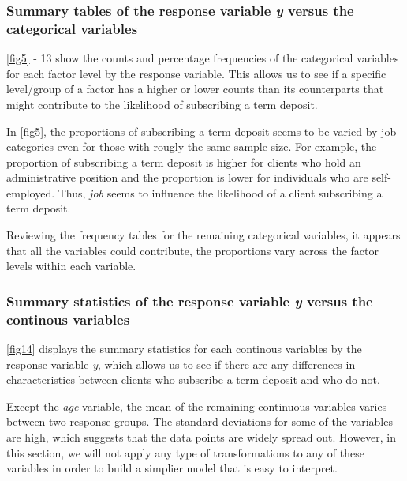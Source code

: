 \documentclass[]{article}
\begin{document}
\subsubsection{\texorpdfstring{Summary tables of the response variable
\emph{y} versus the categorical
variables}{Summary tables of the response variable y versus the categorical variables}}\label{summary-tables-of-the-response-variable-y-versus-the-categorical-variables}

\autoref{fig5} - 13 show the counts and percentage frequencies of the
categorical variables for each factor level by the response variable.
This allows us to see if a specific level/group of a factor has a higher
or lower counts than its counterparts that might contribute to the
likelihood of subscribing a term deposit.

In \autoref{fig5}, the proportions of subscribing a term deposit seems
to be varied by job categories even for those with rougly the same
sample size. For example, the proportion of subscribing a term deposit
is higher for clients who hold an administrative position and the
proportion is lower for individuals who are self-employed. Thus,
\emph{job} seems to influence the likelihood of a client subscribing a
term deposit.

Reviewing the frequency tables for the remaining categorical variables,
it appears that all the variables could contribute, the proportions vary
across the factor levels within each variable.

\subsubsection{\texorpdfstring{Summary statistics of the response
variable \emph{y} versus the continous
variables}{Summary statistics of the response variable y versus the continous variables}}\label{summary-statistics-of-the-response-variable-y-versus-the-continous-variables}

\autoref{fig14} displays the summary statistics for each continous
variables by the response variable \emph{y}, which allows us to see if
there are any differences in characteristics between clients who
subscribe a term deposit and who do not.

Except the \emph{age} variable, the mean of the remaining continuous
variables varies between two response groups. The standard deviations
for some of the variables are high, which suggests that the data points
are widely spread out. However, in this section, we will not apply any
type of transformations to any of these variables in order to build a
simplier model that is easy to interpret.
\end{document}
